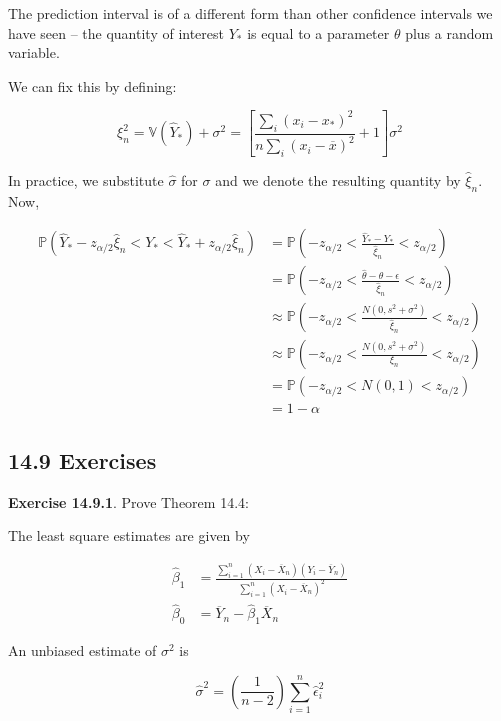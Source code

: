 The prediction interval is of a different form than other confidence
intervals we have seen -- the quantity of interest \(Y_*\) is equal to a
parameter \(\theta\) plus a random variable.

We can fix this by defining:

\[ \xi_{n}^{2} = \mathbb{V}(\hat{Y}_*) + \sigma^{2} = \left[\frac{\sum_{i} (x_{i} - x_*)^{2}}{n \sum_{i} (x_{i} - \overline{x})^{2}} + 1\right] \sigma^{2}\]

In practice, we substitute \(\hat{\sigma}\) for \(\sigma\) and we denote
the resulting quantity by \(\hat{\xi}_{n}\). Now,

\begin{align*}
\mathbb{P}(\hat{Y}_* - z_{\alpha/2} \hat{\xi}_{n} < Y_* < \hat{Y}_* + z_{\alpha/2} \hat{\xi}_{n}) &=
\mathbb{P}\left(-z_{\alpha/2} < \frac{\hat{Y}_* - Y_*}{\hat{\xi}_{n}} < z_{\alpha/2} \right)\\
&= \mathbb{P}\left(-z_{\alpha/2} < \frac{\hat{\theta} - \theta - \epsilon}{\hat{\xi}_{n}} < z_{\alpha/2} \right) \\
&\approx \mathbb{P}\left(-z_{\alpha/2} < \frac{N(0, s^{2} + \sigma^{2})}{\hat{\xi}_{n}} < z_{\alpha/2} \right)  \\
&\approx \mathbb{P}\left(-z_{\alpha/2} < \frac{N(0, s^{2} + \sigma^{2})}{\xi_{n}} < z_{\alpha/2} \right)  \\
&= \mathbb{P}(-z_{\alpha/2} < N(0, 1) < z_{\alpha/2}) \\
&= 1 - \alpha
\end{align*}

\subsection*{14.9 Exercises}

\textbf{Exercise 14.9.1}. Prove Theorem 14.4:

The least square estimates are given by

\begin{align*}
\hat{\beta}_{1} &= \frac{\sum_{i=1}^{n} (X_{i} - \overline{X}_{n}) (Y_{i} - \overline{Y}_{n})}{\sum_{i=1}^{n} (X_{i} - \overline{X}_{n})^{2}}\\
\hat{\beta}_{0} &= \overline{Y}_{n} - \hat{\beta}_{1} \overline{X}_{n}
\end{align*}

An unbiased estimate of \(\sigma^{2}\) is

\[
\hat{\sigma}^{2} = \left( \frac{1}{n - 2} \right) \sum_{i=1}^{n} \hat{\epsilon}_{i}^{2}
\]

